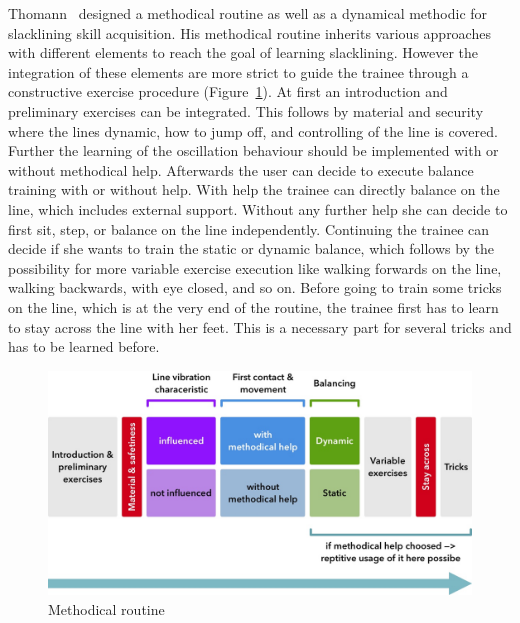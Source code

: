 Thomann~\cite{Thomann2013-aa} designed a methodical routine as well as a dynamical methodic for slacklining skill acquisition. His methodical routine inherits various approaches with different elements to reach the goal of learning slacklining. However the integration of these elements are more strict to guide the trainee through a constructive exercise procedure (Figure~\ref{fig:3_3_1_methodicalRoutine}). At first an introduction and preliminary exercises can be integrated. This follows by material and security where the lines dynamic, how to jump off, and controlling of the line is covered. Further the learning of the oscillation behaviour should be implemented with or without methodical help. Afterwards the user can decide to execute balance training with or without help. With help the trainee can directly balance on the line, which includes external support. Without any further help she can decide to first sit, step, or balance on the line independently. Continuing the trainee can decide if she wants to train the static or dynamic balance, which follows by the possibility for more variable exercise execution like walking forwards on the line, walking backwards, with eye closed, and so on. Before going to train some tricks on the line, which is at the very end of the routine, the trainee first has to learn to stay across the line with her feet. This is a necessary part for several tricks and has to be learned before.
\begin{figure}[htb]
	\centering
	\begin{minipage}[t]{1\linewidth}
		\centering
		\includegraphics[width=1\linewidth]{Pictures/3_3_1_methodicalRoutine3}
		\caption{Methodical routine~\cite{Thomann2013-aa}}
		\label{fig:3_3_1_methodicalRoutine}
	\end{minipage}
\end{figure}

